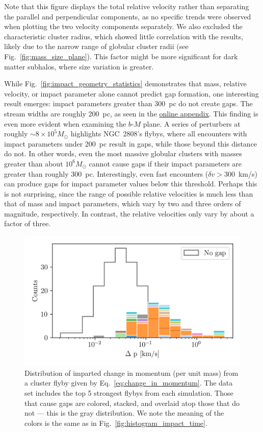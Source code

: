         Note that this figure displays the total relative velocity rather than separating the parallel and perpendicular components, as no specific trends were observed when plotting the two velocity components separately. We also excluded the characteristic cluster radius, which showed little correlation with the results, likely due to the narrow range of globular cluster radii (see Fig.~\ref{fig:mass_size_plane}). This factor might be more significant for dark matter subhalos, where size variation is greater.      
  
        While Fig.~\ref{fig:impact_geometry_statistics} demonstrates that mass, relative velocity, or impact parameter alone cannot predict gap formation, one interesting result emerges: impact parameters greater than 300~pc do not create gaps. The stream widths are roughly 200~pc, as seen in the \href{https://doi.org/10.5281/zenodo.15528089}{online appendix}. This finding is even more evident when examining the $b$-$M$ plane. A series of perturbers at roughly $\sim8 \times 10^5 M_\odot$ highlights NGC~2808's flybys, where all encounters with impact parameters under 200~pc result in gaps, while those beyond this distance do not. In other words, even the most massive globular clusters with masses greater than about $10^6 M_\odot$ cannot cause gaps if their impact parameters are greater than roughly $300$~pc. Interestingly, even fast encounters ($\delta v > 300$~km/s) can produce gaps for impact parameter values below this threshold. Perhaps this is not surprising, since the range of possible relative velocities is much less than that of mass and impact parameters, which vary by two and three orders of magnitude, respectively. In contrast, the relative velocities only vary by about a factor of three.

        \begin{figure}
            \centering
            \includegraphics[width=.7\linewidth]{images/impact_geometry_statistics_deltaP.png}
            \caption[Distribution of imparted change in momentum for all close encounters]{Distribution of imparted change in momentum (per unit mass) from a cluster flyby given by Eq.~\ref{eq:change_in_momentum}. The data set includes the top 5 strongest flybys from each simulation. Those that cause gaps are colored, stacked, and overlaid atop those that do not — this is the gray distribution. We note the meaning of the colors is the same as in Fig.~\ref{fig:histogram_impact_time}.}
            \label{fig:deltap}
        \end{figure}

